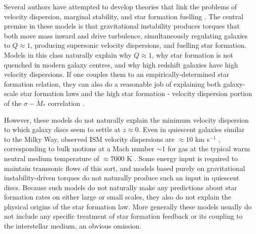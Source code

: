 \documentclass[useAMS,usenatbib]{mn2e}
\begin{document}
Several authors have attempted to develop theories that link the problems of velocity dispersion, marginal stability, and star formation fuelling \citep[e.g.,][]{bournaud07a, bournaud09a, agertz09b, dekel09a, ceverino10a, krumholz10c, vollmer11a, cacciato12a, forbes12a, forbes14a, goldbaum15a, goldbaum16a}. The central premise in these models is that gravitational instability produces torques that both move mass inward and drive turbulence, simultaneously regulating galaxies to $Q\approx 1$, producing supersonic velocity dispersions, and fuelling star formation. Models in this class naturally explain why $Q\approx 1$, why star formation is not quenched in modern galaxy centres, and why high redshift galaxies have high velocity dispersions. If one couples them to an empirically-determined star formation relation, they can also  do a reasonable job of explaining both galaxy-scale star formation laws and the high star formation - velocity dispersion portion of the $\sigma-\dot{M}_*$ correlation \citep{zheng13a, krumholz16a, wong16a}.

However, these models do not naturally explain the minimum velocity dispersion to which galaxy discs seem to settle at $z\approx 0$. Even in quiescent galaxies similar to the Milky Way, observed ISM velocity dispersions are $\approx 10$ km s$^{-1}$ \citep[e.g.,][]{ianjamasimanana12a}, corresponding to bulk motions at a Mach number $\sim 1$ for gas at the typical warm neutral medium temperature of $\approx 7000$ K \citep{wolfire03a}. Some energy input is required to maintain transsonic flows of this sort, and models based purely on gravitational instability-driven torques do not naturally produce such an input in quiescent discs. Because such models do not naturally make any predictions about star formation rates on either large or small scales, they also do not explain the physical origins of the star formation law. More generally these models usually do not include any specific treatment of star formation feedback or its coupling to the interstellar medium, an obvious omission.
\end{document}
